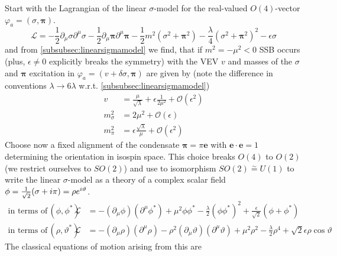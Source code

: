 Start with the Lagrangian of the linear $\sigma$-model for the real-valued $O(4)$-vector $\varphi_a=(\sigma,\mathbf{\pi})$.
\begin{equation}
    \mathscr{L}=-\frac{1}{2}\partial_\mu\sigma\partial^\mu\sigma-\frac{1}{2}\partial_\mu\mathbf{\pi}\partial^\mu\mathbf{\pi}-\frac{1}{2}m^2(\sigma^2+\mathbf{\pi}^2)-\frac{\lambda}{4}(\sigma^2+\mathbf{\pi}^2)^2-\epsilon\sigma
\end{equation}
and from \ref{subsubsec:linearsigmamodel} we find, that if $m^2=-\mu^2<0$ SSB occurs (plus, $\epsilon\neq 0$ explicitly breaks the symmetry) with the VEV $v$ and masses of the $\sigma$ and $\mathbf{\pi}$ excitation in $\varphi_a=(v+\delta\sigma,\mathbf{\pi})$ are given by (note the difference in conventions $\lambda\to 6\lambda$ w.r.t. \ref{subsubsec:linearsigmamodel})
\begin{subequations}
    \begin{align}
        v          & =\frac{\mu}{\sqrt{\lambda}}+\epsilon\frac{1}{2\mu^2}+\mathcal{O}(\epsilon^2) \\
        m_\sigma^2 & =2\mu^2+\mathcal{O}(\epsilon)                                                \\
        m_\pi^2    & =\epsilon\frac{\sqrt{\lambda}}{\mu}+\mathcal{O}(\epsilon^2)
    \end{align}
\end{subequations}
Choose now a fixed alignment of the condensate $\mathbf{\pi}=\pi\mathbf{e}$ with $\mathbf{e}\cdot\mathbf{e}=1$ determining the orientation in isospin space. This choice breaks $O(4)$ to $O(2)$ (we restrict ourselves to $SO(2)$) and use to isomorphism $SO(2)\overset{\sim}{=}U(1)$ to write the linear $\sigma$-model as a theory of a complex scalar field $\phi=\frac{1}{\sqrt{2}}(\sigma+{i}\pi)=\rho e^{{i}\vartheta}$.
\begin{subequations}
    \begin{align}
        \text{in terms of}\,(\phi,\phi^*)      &  & \mathscr{L} & =-(\partial_\mu\phi)(\partial^\mu\phi^*)+\mu^2\phi\phi^*-\frac{\lambda}{2}(\phi\phi^*)^2+\frac{\epsilon}{\sqrt{2}}(\phi+\phi^*)                                   \\
        \text{in terms of}\,(\rho,\vartheta^*) &  & \mathscr{L} & =-(\partial_\mu\rho)(\partial^\mu\rho)-\rho^2(\partial_\mu\vartheta)(\partial^\mu\vartheta)+\mu^2\rho^2-\frac{\lambda}{2}\rho^4+\sqrt{2}\epsilon\rho\cos\vartheta
    \end{align}
\end{subequations}
The classical equations of motion arising from this are
